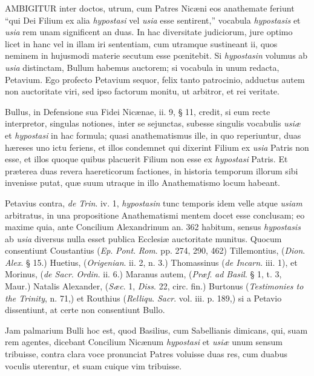
AMBIGITUR
inter doctos, utrum, cum Patres Nicæni eos anathemate feriunt ``qui
Dei Filium ex alia \emph{hypostasi} vel \emph{usia} esse sentirent,''
vocabula \emph{hypostasis} et \emph{usia} rem unam significent an duas.
In hac diversitate judiciorum, jure optimo licet in hanc vel in illam
iri sententiam, cum utramque sustineant ii, quos neminem in hujusmodi
materie secutum esse pœnitebit. Si \emph{hypostasin} volumus ab \emph{usia}
distinctam, Bullum habemus auctorem; si vocabula in unum redacta,
Petavium. Ego profecto Petavium sequor, felix tanto patrocinio,
adductus autem non auctoritate viri, sed ipso factorum monitu, ut
arbitror, et rei veritate.

Bullus, in
Defensione sua Fidei Nicænae, ii. 9, § 11, credit, si eum recte
interpretor, singulas notiones, inter se sejunctas, subesse singulis
vocabulis \emph{usiæ} et \emph{hypostasi} in hac formula; quasi
anathematismus ille, in quo reperiuntur, duas hæreses uno ictu
feriens, et illos condemnet qui dixerint Filium ex \emph{usia} Patris
non esse, et illos quoque quibus placuerit Filium non esse ex \emph{hypostasi}
Patris. Et præterea duas revera haereticorum factiones, in
historia temporum illorum sibi invenisse putat, quæ suum utraque in
illo Anathematismo locum habeant.

Petavius
contra, \emph{de Trin}. iv. 1, \emph{hypostasin} tunc temporis idem
velle atque \emph{usiam} arbitratus, in una propositione Anathematismi
mentem docet esse conclusam; eo maxime quia, ante Concilium
Alexandrinum an. 362 habitum, sensus \emph{hypostasis} ab \emph{usia}
diversus nulla esset publica Ecclesiæ auctoritate munitus. Quocum
consentiunt Coustantius (\emph{Ep}. \emph{Pont}. \emph{Rom}. pp. 274,
290, 462) Tillemontius, (\emph{Dion}. \emph{Alex}. § 15.) Huetius, (\emph{Origenian}.
ii. 2, n. 3.) Thomassinus (\emph{de Incarn}. iii. 1), et Morinus, (\emph{de
Sacr}. \emph{Ordin}. ii. 6.) Maranus autem, (\emph{Præf}. \emph{ad
Basil}. § 1, t. 3, Maur.) Natalis Alexander, (\emph{Sæc}. 1, \emph{Diss}.
22, circ. fin.) Burtonus (\emph{Testimonies to the Trinity}, n. 71,)
et Routhius (\emph{Relliqu}. \emph{Sacr}. vol. iii. p. 189,) si a
Petavio dissentiunt, at certe non consentiunt Bullo.

Jam
palmarium Bulli hoc est, quod Basilius, cum Sabellianis dimicans, qui,
suam rem agentes, dicebant Concilium Nicænum \emph{hypostasi} et \emph{usiæ}
unum sensum tribuisse, contra clara voce pronunciat Patres voluisse
duas res, cum duabus voculis uterentur, et suam cuique vim tribuisse.

